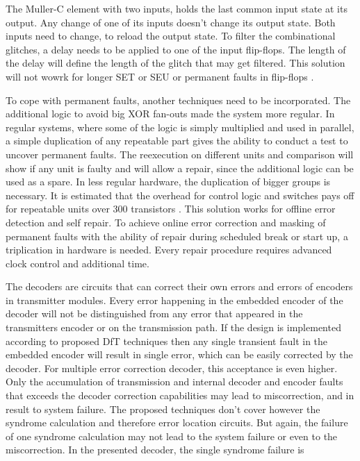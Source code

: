 The Muller-C element with two inputs, holds the last common input state at its output. Any change of one of its inputs doesn't change its output state. Both inputs need to change, to reload the output state. To filter the combinational glitches, a delay needs to be applied to one of the input flip-flops. The length of the delay will define the length of the glitch that may get filtered. This solution will not wowrk for longer SET or SEU or permanent faults in flip-flops \cite{art:Dicorato}.

To cope with permanent faults, another techniques need to be incorporated. The additional logic to avoid big XOR fan-outs made the system more regular. In regular systems, where some of the logic is simply multiplied and used in parallel, a simple duplication of any repeatable part gives the ability to conduct a test to uncover permanent faults. The reexecution on different units and comparison will show if any unit is faulty and will allow a repair, since the additional logic can be used as a spare. In less regular hardware, the duplication of bigger groups is necessary. It is estimated that the overhead for control logic and switches pays off for repeatable units over 300 transistors \cite{rescue_conference}. This solution works for offline error detection and self repair. To achieve online error correction and masking of permanent faults with the ability of repair during scheduled break or start up, a triplication in hardware is needed. Every repair procedure requires advanced clock control and additional time.

The decoders are circuits that can correct their own errors and errors of encoders in transmitter modules. Every error happening in the embedded encoder of the decoder will not be distinguished from any error that appeared in the transmitters encoder or on the transmission path. If the design is implemented according to proposed DfT techniques then any single transient fault in the embedded encoder will result in single error, which can be easily corrected by the decoder. For multiple error correction decoder, this acceptance is even higher. Only the accumulation of transmission and internal decoder and encoder faults that exceeds the decoder correction capabilities may lead to miscorrection, and in result to system failure. The proposed techniques don't cover however the syndrome calculation and therefore error location circuits. But again, the failure of one syndrome calculation may not lead to the system failure or even to the miscorrection. In the presented decoder, the single syndrome failure is 



